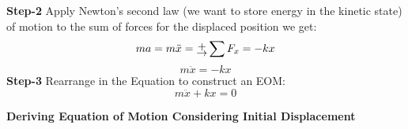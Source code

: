 \documentclass[12pt,letter]{article}
\begin{document}
\begin{example}
			\noindent	\textbf{Step-2} Apply Newton's second law (we want to store energy in the kinetic state) of motion to the sum of forces for the displaced position we get: 		 		
			\begin{equation}
			ma = m\ddot{x} = \rightplus \sum F_x = -kx
			\end{equation}			
			\begin{equation}
			m\ddot{x} = -kx
			\end{equation}				
			\textbf{Step-3} Rearrange in the Equation to construct an EOM: 			
			\begin{equation}
			m\ddot{x} + kx = 0
			\end{equation}		
		\end{example}			

		\pagebreak
		\begin{example}	

			\textbf{Deriving Equation of Motion Considering Initial Displacement}


\end{example}
\end{document}
